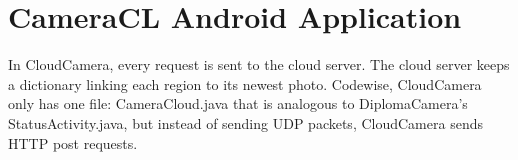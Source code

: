 \chapter{CameraCL Android Application}

In CloudCamera, every request is sent to the cloud server. The cloud server keeps a dictionary linking each region to its newest photo.  Codewise, CloudCamera only has one file: CameraCloud.java that is analogous to DiplomaCamera’s StatusActivity.java, but instead of sending UDP packets, CloudCamera sends HTTP post requests. 
